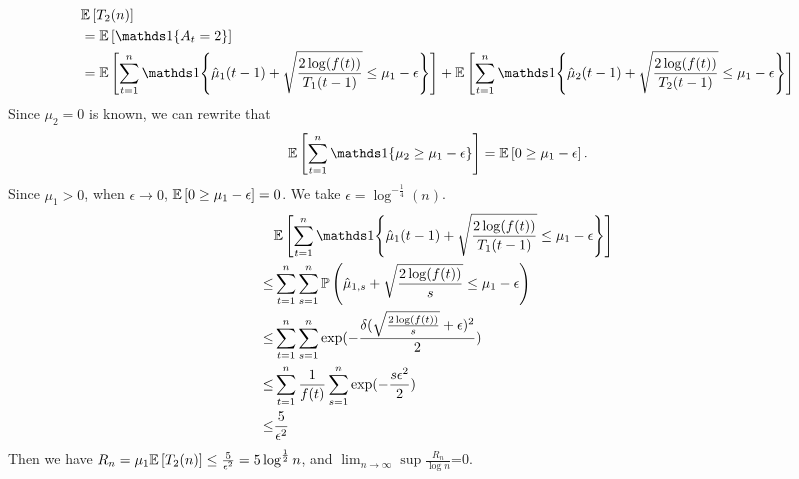     \begin{align*}
    &\EE{T_2(n)}\\
    &=\EE{\bOne{A_t = 2}}\\
    &=\EE{\sum_{t=1}^n\bOne{\hat{\mu}_1(t-1)+\sqrt{\frac{2\log(f(t))}{T_1(t-1)}}\leq \mu_1-\epsilon}} + \EE{\sum_{t=1}^n\bOne{\hat{\mu}_2(t-1)+\sqrt{\frac{2\log(f(t))}{T_2(t-1)}}\leq \mu_1-\epsilon}}
    \end{align*}
    Since $\mu_2=0$ is known, we can rewrite that
    \begin{align*}
    \EE{\sum_{t=1}^n\bOne{\mu_2\geq \mu_1-\epsilon}} = \EE{0\geq\mu_1-\epsilon}.
    \end{align*}
    Since $\mu_1>0$, when $\epsilon\rightarrow 0$, $\mathbb{E} \left[0\geq\mu_1-\epsilon\right] = 0 $. We take $\epsilon=\log^{-\frac{1}{4}}(n)$.
    \begin{align*}
    &\EE{\sum_{t=1}^n\bOne{\hat{\mu}_1(t-1)+\sqrt{\frac{2\log(f(t))}{T_1(t-1)}}\leq \mu_1-\epsilon}}\\
    \leq&\sum_{t=1}^n\sum_{s=1}^n \PP{\hat{\mu}_{1,s}+\sqrt{\frac{2\log(f(t))}{s}}\leq \mu_1-\epsilon}\\
    \leq&\sum_{t=1}^n\sum_{s=1}^n \exp(-\frac{\delta(\sqrt{\frac{2\log(f(t))}{s}}+\epsilon)^2}{2})\\
    \leq&\sum_{t=1}^n \frac{1}{f(t)}\sum_{s=1}^n \exp(-\frac{s\epsilon^2}{2})\\
    \leq&\frac{5}{\epsilon^2}
    \end{align*}
    Then we have $R_n=\mu_1\mathbb{E} \left[T_2(n)\right]\leq\frac{5}{\epsilon^2}=5\log^{\frac{1}{2}}n$, and $\lim_{n\to \infty}\sup\frac{R_n}{\log n}$=0.

